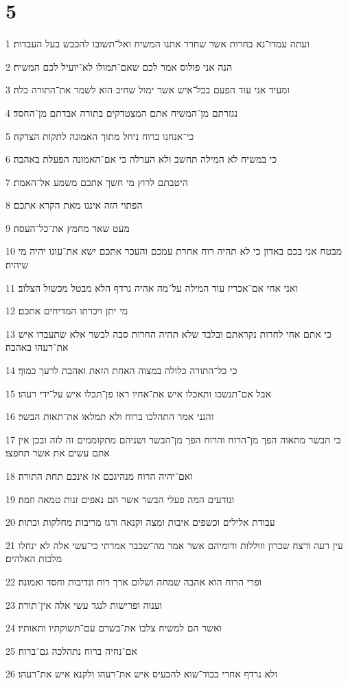 \chapter{5}

\par 1 ועתה עמדו־נא בחרות אשר שחרר אתנו המשיח ואל־תשובו להכבש בעל העבדות׃
\par 2 הנה אני פולוס אמר לכם שאם־תמולו לא־יועיל לכם המשיח׃
\par 3 ומעיד אני עוד הפעם בכל־איש אשר ימול שחיב הוא לשמר את־התורה כלה׃
\par 4 נגזרתם מן־המשיח אתם המצטדקים בתורה אבדתם מן־החסד׃
\par 5 כי־אנחנו ברוח ניחל מתוך האמונה לתקות הצדקה׃
\par 6 כי במשיח לא המילה תחשב ולא הערלה כי אם־האמונה הפעלת באהבה׃
\par 7 היטבתם לרוץ מי חשך אתכם משמע אל־האמת׃
\par 8 הפתוי הזה איננו מאת הקרא אתכם׃
\par 9 מעט שאר מחמץ את־כל־העסה׃
\par 10 מבטח אני בכם באדון כי לא תהיה רוח אחרת עמכם והעכר אתכם ישא את־עונו יהיה מי שיהיה׃
\par 11 ואני אחי אם־אכריז עוד המילה על־מה אהיה נרדף הלא מבטל מכשול הצלוב׃
\par 12 מי יתן ויכרתו המדיחים אתכם׃
\par 13 כי אתם אחי לחרות נקראתם ובלבד שלא תהיה החרות סבה לבשר אלא שתעבדו איש את־רעהו באהבה׃
\par 14 כי כל־התורה כלולה במצוה האחת הזאת ואהבת לרעך כמוך׃
\par 15 אבל אם־תנשכו ותאכלו איש את־אחיו ראו פן־תכלו איש על־ידי רעהו׃
\par 16 והנני אמר התהלכו ברוח ולא תמלאו את־תאות הבשר׃
\par 17 כי הבשר מתאוה הפך מן־הרוח והרוח הפך מן־הבשר ושניהם מתקוממים זה לזה ובכן אין אתם עשים את אשר תחפצו׃
\par 18 ואם־יהיה הרוח מנהיגכם אז אינכם תחת התורה׃
\par 19 ונודעים המה פעלי הבשר אשר הם נאפים זנות טמאה וזמה׃
\par 20 עבודת אלילים וכשפים איבות ומצה וקנאה ורגז מריבות מחלקות וכתות׃
\par 21 עין רעה ורצח שכרון וזוללות ודומיהם אשר אמר מה־שכבר אמרתי כי־עשי אלה לא ינחלו מלכות האלהים׃
\par 22 ופרי הרוח הוא אהבה שמחה ושלום ארך רוח ונדיבות וחסד ואמונה׃
\par 23 וענוה ופרישות לנגד עשי אלה אין־תורה׃
\par 24 ואשר הם למשיח צלבו את־בשרם עם־תשוקתיו ותאותיו׃
\par 25 אם־נחיה ברוח נתהלכה גם־ברוח׃
\par 26 ולא נרדף אחרי כבוד־שוא להכעיס איש את־רעהו ולקנא איש את־רעהו׃

